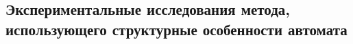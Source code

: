 
\subsection{Экспериментальные исследования метода, использующего структурные особенности автомата}
\label{sec:space:results:pruning}



\chresults{\ref{sec:space}}